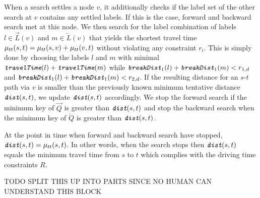 When a search settles a node $v$, it additionally checks if the label set of the other search at $v$ contains any settled labels. If this is the case, forward and backward search met at this node. We then search for the label combination of labels $l \in \overrightarrow{L}(v)$ and $m \in \overleftarrow{L}(v)$ that yields the shortest travel time $\mu_{tt}(s,t) = \mu_{tt}(s,v) + \mu_{tt}(v,t)$ without violating any constraint $r_i$. This is simply done by choosing the labels $l$ and $m$ with minimal $\texttt{\itshape travelTime}(l) + \texttt{\itshape travelTime}(m)$ while $\texttt{\itshape breakDist}_1(l) + \texttt{\itshape breakDist}_1(m) < r_{1,d}$ and $\texttt{\itshape breakDist}_1(l) + \texttt{\itshape breakDist}_1(m) < r_{2,d}$. If the resulting distance for an $s$-$t$ path via $v$ is smaller than the previously known minimum tentative distance $\texttt{\itshape dist}(s,t)$, we update $\texttt{\itshape dist}(s,t)$ accordingly. We stop the forward search if the minimum key of $\overrightarrow{Q}$ is greater than $\texttt{\itshape dist}(s,t)$ and stop the backward search when the minimum key of $\overleftarrow{Q}$ is greater than $\texttt{\itshape dist}(s,t)$.

\begin{theorem}
	At the point in time when forward and backward search have stopped, $\texttt{\itshape dist}(s,t) = \mu_{tt}(s,t)$. In other words, when the search stops then $\texttt{\itshape dist}(s,t)$ equals the minimum travel time from $s$ to $t$ which complies with the driving time constraints $R$.
\end{theorem}

TODO SPLIT THIS UP INTO PARTS SINCE NO HUMAN CAN UNDERSTAND THIS BLOCK

